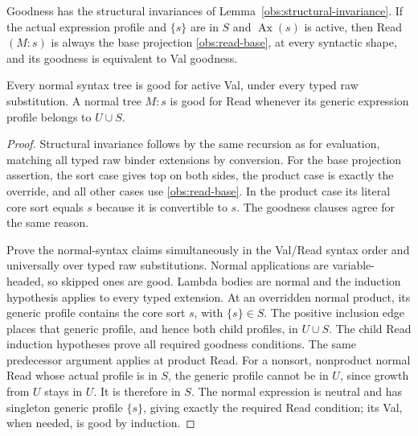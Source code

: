 \begin{lemma}\label{obs:goodness-basic}
Goodness has the structural invariances of
Lemma~\ref{obs:structural-invariance}.  If the actual expression profile
and $\{s\}$ are in $S$ and $\operatorname{Ax}(s)$ is active, then
Read$(M:s)$ is always the base projection
\eqref{obs:read-base}, at every syntactic shape, and its goodness is
equivalent to Val goodness.

Every normal syntax tree is good for active Val, under every typed raw
substitution.  A normal tree $M:s$ is good for Read whenever its generic
expression profile belongs to $U\cup S$.
\end{lemma}
\begin{proof}
Structural invariance follows by the same recursion as for evaluation,
matching all typed raw binder extensions by conversion.  For the base
projection assertion, the sort case gives top on both sides, the
product case is exactly the override, and all other cases use
\eqref{obs:read-base}.  In the product case its literal core sort equals
$s$ because it is convertible to $s$.  The goodness clauses agree for
the same reason.

Prove the normal-syntax claims simultaneously in the Val/Read syntax
order and universally over typed raw substitutions.  Normal applications
are variable-headed, so skipped ones are good.  Lambda bodies are
normal and the induction hypothesis applies to every typed extension.
At an overridden normal product, its generic profile contains the
core sort $s$, with $\{s\}\in S$.  The positive inclusion edge places
that generic profile, and hence both child profiles, in $U\cup S$.
The child Read induction hypotheses prove all required goodness
conditions.  The same predecessor argument applies at product Read.
For a nonsort, nonproduct normal Read whose actual profile is in $S$,
the generic profile cannot be in $U$, since growth from $U$ stays in
$U$.  It is therefore in $S$.  The normal expression is neutral and
has singleton generic profile $\{s\}$, giving exactly the required
Read condition; its Val, when needed, is good by induction.
\end{proof}

